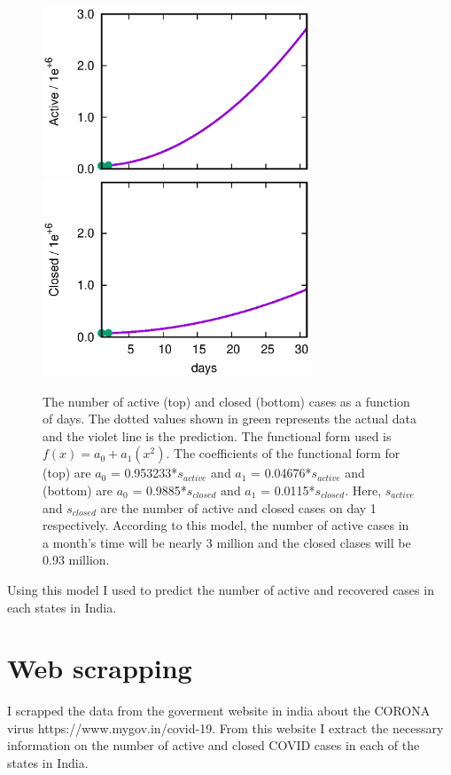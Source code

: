 \documentclass[twocolumn]{article}
\begin{document}
                \begin{figure}
                \centering
                \includegraphics[clip=true,trim=0cm 0cm 0cm
                0cm,width=8cm]{ps.predict.active.ps}\\
                        \vspace{-1.43cm}
                \includegraphics[clip=true,trim=0cm 0cm 0cm
                0cm,width=8cm]{ps.predict.closed.ps}
                        \caption{The number of active (top) and closed (bottom) cases as a function of days. The dotted values shown in green represents the actual data and the violet line is the prediction. The functional form used is $f(x) = a_0 + a_1(x^2)$. The coefficients of the functional form for (top) are $a_0$ = 0.953233*$s_{active}$ and $a_1$ = 0.04676*$s_{active}$ and (bottom) are $a_0$ = 0.9885*$s_{closed}$ and $a_1$ = 0.0115*$s_{closed}$. Here, $s_{active}$ and $s_{closed}$ are the number of active and closed cases on day 1 respectively. According to this model, the number of active cases in a month's time will be nearly 3 million and the closed clases will be 0.93 million.}
                \label{fig:dataset}
                \end{figure}
Using this model I used to predict the number of active and recovered cases in each states in India.
\section{Web scrapping}
I scrapped the data from the goverment website in india about the CORONA virus https://www.mygov.in/covid-19. From this website I extract the necessary information on the number of active and closed COVID cases in each of the states in India.
\end{document}
